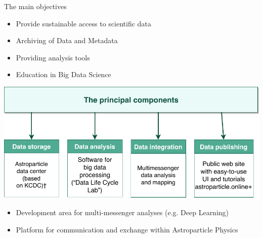 \begin{frame}{The main objectives}
\begin{minipage}[c]{0.45\textwidth}
  \begin{itemize}
    \item  Provide sustainable access to scientific data
    \item  Archiving of Data and Metadata
    \item  Providing analysis tools
    \item  Education in Big Data Science
  \end{itemize}
\end{minipage}
\hfill
\begin{minipage}[c]{0.54\textwidth}
  \includegraphics[width=1\textwidth]{pics/proj_objectives.pdf}
\end{minipage}
  \vspace{-\topsep}
  \vspace{-\partopsep}
  \vspace{\itemsep}
  \vspace{\parsep}
  \begin{itemize}
    \item  Development area for multi-messenger analyses (e.g. Deep Learning)
    \item  Platform for communication and exchange within Astroparticle Physics
  \end{itemize}
\end{frame}

